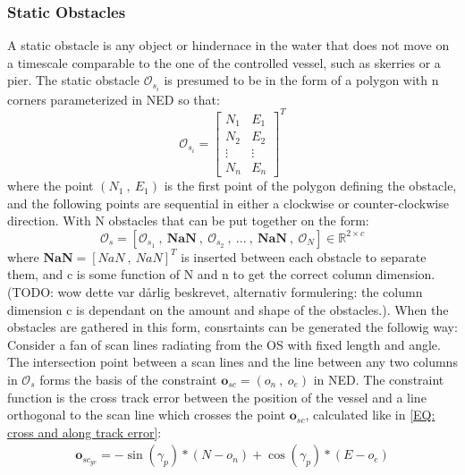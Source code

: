 \subsubsection*{Static Obstacles}
A static obstacle is any object or hindernace in the water that does not move on a timescale comparable to the one of the controlled
vessel, such as skerries or a pier. The static obstacle $\mathcal{O}_{s_{i}}$ is presumed to be in the form of a polygon with n corners parameterized
in NED so that:
\begin{equation}
    \mathcal{O}_{s_{i}} = \begin{bmatrix}
                              N_1 & E_1 \\
                              N_2 & E_2 \\
                            \vdots & \vdots\\
                              N_n & E_n
                            \end{bmatrix}^T
\end{equation}
where the point $(N_1 \ , \ E_1)$ is the first point of the polygon defining the obstacle, and the following points are sequential in either a clockwise
or counter-clockwise direction. With N obstacles that can be put together on the form:
\begin{equation}
    \mathcal{O}_s = [\mathcal{O}_{s_{1}} \ , \ \textbf{NaN} \ , \ \mathcal{O}_{s_{2}} \ , \ ... \ , \ \textbf{NaN} \ , \ \mathcal{O}_N] \in \mathbb{R}^{2 \times c}
\end{equation}
where $\textbf{NaN} = [NaN \ , \ NaN]^T$ is inserted between each obstacle to separate them, and c is some function of N and n to get the correct column dimension.
(TODO: wow dette var dårlig beskrevet, alternativ formulering: the column dimension c is dependant on the amount and shape of the obstacles.). 
When the obstacles are gathered in this form, consrtaints can be generated the followig way:\newline
Consider a fan of scan lines radiating from the \gls{OS} with fixed length and angle. The intersection
point between a scan lines and the line between any two columns in $\mathcal{O}_s$ forms the basis of the constraint 
$\mathbf{o}_{sc} = (o_n \ , \ o_e)$ in NED.\newline
The constraint function is the cross track error between the position of the vessel and a line orthogonal to the scan line which crosses
the point $\mathbf{o}_{sc}$, calculated like in \eqref{EQ: cross and along track error}:
\begin{eqnarray}
    \mathbf{o}_{sc_{ye}} = -\sin(\gamma_p)*(N-o_n) + \cos(\gamma_p)*(E-o_e)
\end{eqnarray}
